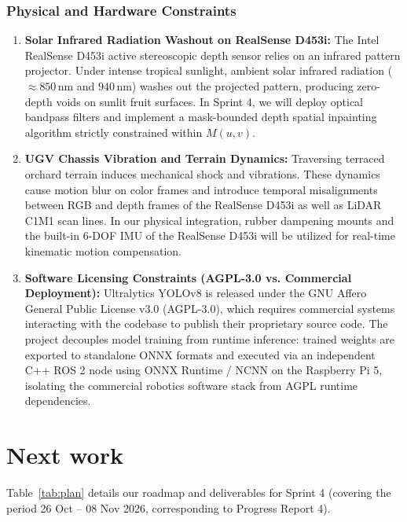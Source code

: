 \documentclass[12pt,a4paper]{article}
\begin{document}
\subsubsection{Physical and Hardware Constraints}
\begin{enumerate}
    \item \textbf{Solar Infrared Radiation Washout on RealSense D453i:}
    The Intel RealSense D453i active stereoscopic depth sensor relies on an infrared pattern projector. Under intense tropical sunlight, ambient solar infrared radiation ($\approx 850\,\text{nm}$ and $940\,\text{nm}$) washes out the projected pattern, producing zero-depth voids on sunlit fruit surfaces. In Sprint 4, we will deploy optical bandpass filters and implement a mask-bounded depth spatial inpainting algorithm strictly constrained within $M(u, v)$.
    
    \item \textbf{UGV Chassis Vibration and Terrain Dynamics:}
    Traversing terraced orchard terrain induces mechanical shock and vibrations. These dynamics cause motion blur on color frames and introduce temporal misalignments between RGB and depth frames of the RealSense D453i as well as LiDAR C1M1 scan lines. In our physical integration, rubber dampening mounts and the built-in 6-DOF IMU of the RealSense D453i will be utilized for real-time kinematic motion compensation.
    
    \item \textbf{Software Licensing Constraints (AGPL-3.0 vs. Commercial Deployment):}
    Ultralytics YOLOv8 is released under the GNU Affero General Public License v3.0 (AGPL-3.0), which requires commercial systems interacting with the codebase to publish their proprietary source code. The project decouples model training from runtime inference: trained weights are exported to standalone ONNX formats and executed via an independent C++ ROS 2 node using ONNX Runtime / NCNN on the Raspberry Pi 5, isolating the commercial robotics software stack from AGPL runtime dependencies.
\end{enumerate}
\section{Next work}

Table~\ref{tab:plan} details our roadmap and deliverables for Sprint 4 (covering the period 26 Oct -- 08 Nov 2026, corresponding to Progress Report 4).
\end{document}
